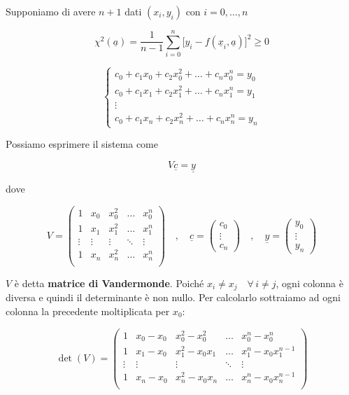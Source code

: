 Supponiamo di avere $n+1$ dati $(x_i,y_i)$ con $i=0,\ldots,n$

$$\chi^2(\underline{a})
=\frac{1}{n-1} \sum_{i=0}^{n} \big[ y_i - f(\underline{x}_i,\underline{a}) \big]^2\geq0$$

$$\begin{cases}
   c_0 + c_1x_0 + c_2 x_0^2 + \ldots + c_n x_0^n=y_0\\
   c_0 + c_1x_1 + c_2 x_1^2 + \ldots + c_n x_1^n=y_1\\
   \vdots\\
   c_0 + c_1x_n + c_2 x_n^2 + \ldots + c_n x_n^n=y_n
\end{cases}$$

Possiamo esprimere il sistema come

$$V \underline{c}=\underline{y}$$

dove

$$V=
\begin{pmatrix}
   1 & x_0 & x_0^2 & \ldots & x_0^n\\
   1 & x_1 & x_1^2 & \ldots & x_1^n\\
   \vdots & \vdots & \vdots & \ddots & \vdots\\
   1 & x_n & x_n^2 & \ldots & x_n^n\\
\end{pmatrix}
\quad,\quad
\underline{c}=
\begin{pmatrix}
   c_0\\
   \vdots\\
   c_n
\end{pmatrix}
\quad,\quad
\underline{y}=
\begin{pmatrix}
   y_0\\
   \vdots\\
   y_n
\end{pmatrix}$$

$V$ è detta \textbf{matrice di Vandermonde}. Poiché $x_i \neq x_j \quad \forall \, i \neq j$, ogni colonna è diversa e quindi il determinante è non nullo. Per calcolarlo sottraiamo ad ogni colonna la precedente moltiplicata per $x_0$:

$$\det (V)=
\begin{pmatrix}
   1 & x_0 - x_0 & x_0^2 - x_0^2 & \ldots & x_0^n - x_0^n\\
   1 & x_1 - x_0 & x_1^2 - x_0x_1 & \ldots & x_1^n - x_0x_1^{n-1}\\
   \vdots & \vdots & \vdots & \ddots & \vdots\\
   1 & x_n - x_0 & x_n^2 - x_0x_n & \ldots & x_n^n - x_0 x_n^{n-1}\\
\end{pmatrix}$$

